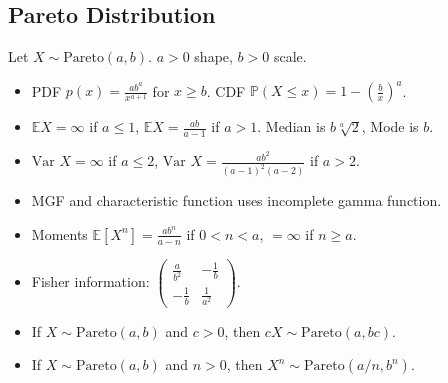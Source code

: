 \documentclass[twoside]{article}
\newcommand{\dis}{\displaystyle}
\newcommand\bbE{\mathbb{E}}
\newcommand\bbP{\mathbb{P}}
\newcommand\var{\text{Var }}
\begin{document}
\subsection{Pareto Distribution}
Let $X \sim \text{Pareto}(a,b)$. $a > 0$ shape, $b > 0$ scale.
\begin{itemize}
\item PDF $p(x) = \dis\frac{ab^a}{x^{a+1}}$ for $x \geq b$. CDF $\bbP(X \leq x) = 1 - \left(\dis\frac{b}{x}\right)^a$.

\item $\bbE X = \infty$ if $a \leq 1$, $\bbE X = \dis\frac{ab}{a-1}$ if $a > 1$. Median is $b\sqrt[a]{2}$, Mode is $b$.

\item $\var X = \infty$ if $a \leq 2$, $\var X = \dis\frac{ab^2}{(a-1)^2(a-2)}$ if $a > 2$.

\item MGF and characteristic function uses incomplete gamma function.

\item Moments $\bbE [X^n] = \dis\frac{ab^n}{a-n}$ if $0 < n < a$, $= \infty$ if $n \geq a$.

\item Fisher information: $\begin{pmatrix} \frac{a}{b^2} & -\frac{1}{b} \\ -\frac{1}{b} & \frac{1}{a^2}  \end{pmatrix}$.

\item If $X \sim \text{Pareto}(a,b)$ and $c > 0$, then $cX \sim \text{Pareto}(a,bc)$.

\item If $X \sim \text{Pareto}(a,b)$ and $n > 0$, then $X^n \sim \text{Pareto}(a/n,b^n)$.
\end{itemize}

\end{document}
